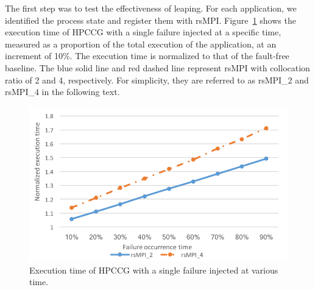 The first step was to test the effectiveness of leaping. For each application, we identified the process state and register them with rsMPI. Figure~\ref{fig:single_failure} shows the execution time of HPCCG with a single failure injected at a specific time, measured as a proportion of the total execution of the application, at an increment of 10\%.
The execution time is normalized to that of the fault-free baseline.   
The blue solid line and red dashed line represent rsMPI with collocation ratio of 2 and 4, respectively. For simplicity, they are referred to as rsMPI\_2 and rsMPI\_4 in the following text.  

\begin{figure}[!t]
  \begin{center}
      \includegraphics[width=\columnwidth]{figures/single_failure_2}
  \end{center}
  \caption{Execution time of HPCCG with a single failure injected at various time.}
  \label{fig:single_failure}
\vspace{-0.1in}
\end{figure}

